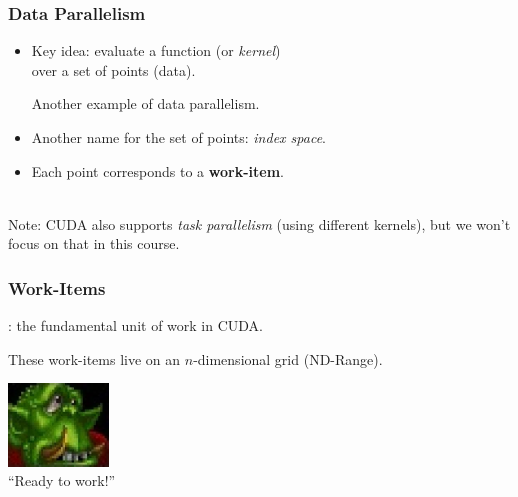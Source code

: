 \begin{frame}
  \frametitle{Data Parallelism}


  \begin{itemize}
    \item Key idea: evaluate a function (or {\it kernel}) \\
     \qquad over a set of points (data).\\

\begin{center}
\end{center}

      Another example of data parallelism.\\[1em]
    \item Another name for the set of points: {\it index space}.
    \item Each point corresponds to a {\bf work-item}.
  \end{itemize}~\\[1em]

  Note: CUDA also supports {\it task parallelism} (using different kernels),
  but we won't focus on that in this course.

\end{frame}

\begin{frame}
  \frametitle{Work-Items}


    : the fundamental unit of work in CUDA.
    
 These work-items live on an $n$-dimensional grid (ND-Range).
    
    \begin{center}
	\includegraphics[width=0.2\textwidth]{images/peon.jpeg}\\
	\hfill ``Ready to work!''
	\end{center}
    
\end{frame}
    
